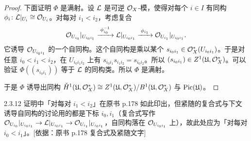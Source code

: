 \begin{proof}
下面证明 $\Phi$ 是满射。设 $\mathcal{L}$ 是可逆 $\mathcal{O}_X$-模，使得对每个 $i\in I$ 有同构 $\phi_i\colon\mathcal{L}|_{U_i}\cong\mathcal{O}_{U_i}$。对每对 $i_1<i_2$，考虑复合
\[
\mathcal{O}_{U_{i_0}}|_{U_{i_0i_1}}\xrightarrow{\;\phi_{i_0}^{-1}\;}\mathcal{L}|_{U_{i_0i_1}}\xrightarrow{\;\phi_{i_1}\;}\mathcal{O}_{U_{i_1}}|_{U_{i_0i_1}}.
\]
它诱导 $\mathcal{O}_{U_{i_0i_1}}$ 的一个自同构。这个自同构是乘以某个 $s_{i_0i_1}\in\mathcal{O}_X^{*}(U_{i_0i_1})$。于是对任意 $i_0<i_1<i_2$，在 $U_{i_0i_1i_2}$ 上有 $s_{i_0i_1}s_{i_1i_2}=s_{i_0i_2}$。所以 $(s_{i_0i_1})\in Z^1(\mathfrak{U},\mathcal{O}_X^{*})$。可以验证 $\Phi((s_{i_0i_1}))$ 等于 $\mathcal{L}$ 的同构类。所以 $\Phi$ 是满射。

于是 $\Phi$ 诱导出同构 $\check{H}^1(\mathfrak{U},\mathcal{O}_X^{*})\cong Z^1(\mathfrak{U},\mathcal{O}_X^{*})/B^1(\mathfrak{U},\mathcal{O}_X^{*})$ 与 $\mathrm{Pic}(\mathfrak{U})$。
\end{proof}

\begin{tnote}
2.3.12 证明中「对每对 $i_1<i_2$」在原书 p.178 如此印出，但紧随的复合式与下文诱导自同构的讨论用的都是下标 $i_0,i_1$（复合式写作 $\mathcal{O}_{U_{i_0}}|_{U_{i_0i_1}}\to\mathcal{L}|_{U_{i_0i_1}}\to\mathcal{O}_{U_{i_1}}|_{U_{i_0i_1}}$，自同构落在 $\mathcal{O}_{U_{i_0i_1}}$ 上），故此处应为「对每对 $i_0<i_1$」。[依据：原书 p.178 复合式及紧随文字]
\end{tnote}

